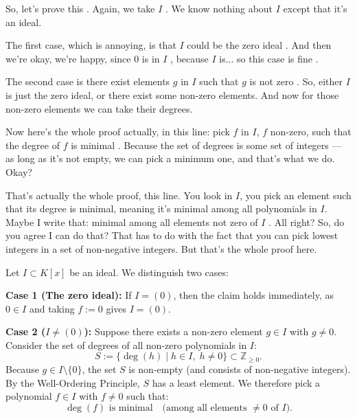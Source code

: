 \begin{proofWrapper}

\begin{speech}[00:32:20 - 00:34:07]
So, let's prove this . Again, we take $I$ . We know nothing about $I$ except that it's an ideal.

The first case, which is annoying, is that $I$ could be the zero ideal . And then we're okay, we're happy, since $0$ is in $I$ , because $I$ is... so this case is fine .

The second case is there exist elements $g$ in $I$ such that $g$ is not zero . So, either $I$ is just the zero ideal, or there exist some non-zero elements. And now for those non-zero elements we can take their degrees.

Now here's the whole proof actually, in this line: pick $f$ in $I$, $f$ non-zero, such that the degree of $f$ is minimal . Because the set of degrees is some set of integers --- as long as it's not empty, we can pick a minimum one, and that's what we do. Okay?

That's actually the whole proof, this line. You look in $I$, you pick an element such that its degree is minimal, meaning it's minimal among all polynomials in $I$. Maybe I write that: minimal among all elements not zero of $I$ . All right? So, do you agree I can do that? That has to do with the fact that you can pick lowest integers in a set of non-negative integers. But that's the whole proof here.
\end{speech}

\begin{content}
Let $I \subset K[x]$ be an ideal. We distinguish two cases:

\textbf{Case 1 (The zero ideal):} If $I = (0)$, then the claim holds immediately, as $0 \in I$ and taking $f := 0$ gives $I = (0)$.

\textbf{Case 2 ($I \neq (0)$):} Suppose there exists a non-zero element $g \in I$ with $g \neq 0$. Consider the set of degrees of all non-zero polynomials in $I$:
\[
S := \{ \deg(h) \mid h \in I,\; h \neq 0 \} \subset \mathbb{Z}_{\ge 0}.
\]
Because $g \in I \setminus \{0\}$, the set $S$ is non-empty (and consists of non-negative integers). By the Well-Ordering Principle, $S$ has a least element. We therefore pick a polynomial $f \in I$ with $f \neq 0$ such that:
\begin{equation}\label{eq:minimal-deg-f}
\deg(f) \text{ is minimal} \quad \text{(among all elements } \neq 0 \text{ of } I\text{)}.
\end{equation}
\end{content}


\end{proofWrapper}
